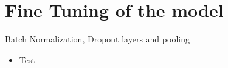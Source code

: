 \section{Fine Tuning of the model}

\begin{frame}{Batch Normalization, Dropout layers and pooling}
\begin{itemize}
\item Test
\end{itemize}
\end{frame}

